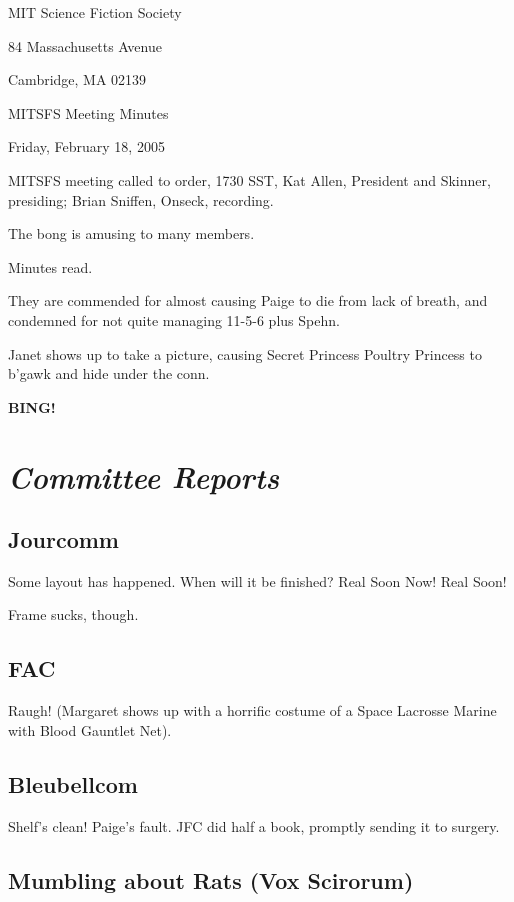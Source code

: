 \documentclass[10pt]{article}
\newcommand{\bing}{{\bf BING!} }
\newcommand{\goto}[1]{\bing \vskip 12pt \section*{{\em{#1}}}}
\newcommand{\ps}{ plus Spehn\xspace}
\begin{document}
\begin{center}

MIT Science Fiction Society

84 Massachusetts Avenue

Cambridge, MA 02139

\vspace{12pt}

MITSFS Meeting Minutes

Friday, February 18, 2005

\end{center}

\vspace{18pt}

\setlength{\parskip}{6pt}

\noindent
MITSFS meeting called to order, 1730 SST, Kat Allen, President and
Skinner, presiding; Brian Sniffen,  Onseck, recording.

The bong is amusing to many members.

Minutes read.

They are commended for almost causing Paige to die from lack of
breath, and condemned for not quite managing 11-5-6\ps.

Janet shows up to take a picture, causing Secret Princess Poultry
Princess to b'gawk and hide under the conn.


\goto{Committee Reports}
\subsection*{Jourcomm}
Some layout has happened.  When will it be finished?  Real Soon Now!
Real Soon!

Frame sucks, though.

\subsection*{FAC}

Raugh!  (Margaret shows up with a horrific costume of a Space Lacrosse
Marine with Blood Gauntlet Net).

\subsection*{Bleubellcom}
Shelf's clean!  Paige's fault.  JFC did half a book, promptly
sending it to surgery.

\subsection*{Mumbling about Rats (Vox Scirorum)}
\end{document}
